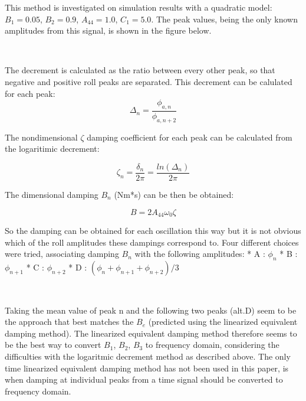 This method is investigated on simulation results with a quadratic
model: \(B_1 = 0.05\), \(B_2 = 0.9\), \(A_{44} = 1.0\), \(C_1 = 5.0\).
The peak values, being the only known amplitudes from this signal, is
shown in the figure below.

    \begin{center}
    \end{center}
    { \hspace*{\fill} \\}
    
    The decrement is calculated as the ratio between every other peak, so
that negative and positive roll peaks are separated. This decrement can
be calulated for each peak:
\[ \Delta_n = \frac{\phi_{a,n}}{\phi_{a,n+2}}\]

    The nondimensional \(\zeta\) damping coefficient for each peak can be
calculated from the logaritimic decrement:

    \[\zeta_n = \frac{\delta_n}{2\pi}=\frac{ln(\Delta_n)}{2\pi}\]

    The dimensional damping \(B_n\) (Nm*s) can be then be obtained:
 
            
    
    \begin{equation}
B = 2 A_{44} \omega_{0} \zeta
\label{eq:equation}
\end{equation}

    

    So the damping can be obtained for each oscillation this way but it is
not obvious which of the roll amplitudes these dampings correspond to.
Four different choices were tried, associating damping \(B_n\) with the
following amplitudes: * A : \(\phi_n\) * B : \(\phi_{n+1}\) * C :
\(\phi_{n+2}\) * D : \((\phi_n + \phi_{n+1} + \phi_{n+2})/3\)

    \begin{center}
    \end{center}
    { \hspace*{\fill} \\}
    
    Taking the mean value of peak n and the following two peaks (alt.D) seem
to be the approach that best matches the \(B_e\) (predicted using the
linearized equivalent damping method). The linearized equivalent damping
method therefore seems to be the best way to convert \(B_1\), \(B_2\),
\(B_3\) to frequency domain, considering the difficulties with the
logaritmic decrement method as described above. The only time linearized
equivalent damping method has not been used in this paper, is when
damping at individual peaks from a time signal should be converted to
frequency domain.

